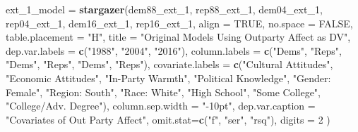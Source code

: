 \documentclass[
]{article}
\newenvironment{Shaded}{\begin{snugshade}}{\end{snugshade}}
\newcommand{\DataTypeTok}[1]{\textcolor[rgb]{0.13,0.29,0.53}{#1}}
\newcommand{\DecValTok}[1]{\textcolor[rgb]{0.00,0.00,0.81}{#1}}
\newcommand{\KeywordTok}[1]{\textcolor[rgb]{0.13,0.29,0.53}{\textbf{#1}}}
\newcommand{\NormalTok}[1]{#1}
\newcommand{\OtherTok}[1]{\textcolor[rgb]{0.56,0.35,0.01}{#1}}
\newcommand{\StringTok}[1]{\textcolor[rgb]{0.31,0.60,0.02}{#1}}
\begin{document}
\begin{Shaded}
\begin{Highlighting}[]
\NormalTok{ext_}\DecValTok{1}\NormalTok{_model =}\StringTok{ }\KeywordTok{stargazer}\NormalTok{(dem88_ext_}\DecValTok{1}\NormalTok{, rep88_ext_}\DecValTok{1}\NormalTok{, dem04_ext_}\DecValTok{1}\NormalTok{, rep04_ext_}\DecValTok{1}\NormalTok{, dem16_ext_}\DecValTok{1}\NormalTok{, rep16_ext_}\DecValTok{1}\NormalTok{, }\DataTypeTok{align =} \OtherTok{TRUE}\NormalTok{, }\DataTypeTok{no.space =} \OtherTok{FALSE}\NormalTok{,}
                                            \DataTypeTok{table.placement =} \StringTok{"H"}\NormalTok{,}
                                            \DataTypeTok{title =} \StringTok{"Original Models Using Outparty Affect as DV"}\NormalTok{,}
                                            \DataTypeTok{dep.var.labels =} \KeywordTok{c}\NormalTok{(}\StringTok{"1988"}\NormalTok{, }\StringTok{"2004"}\NormalTok{, }\StringTok{"2016"}\NormalTok{),}
                                            \DataTypeTok{column.labels =} \KeywordTok{c}\NormalTok{(}\StringTok{"Dems"}\NormalTok{, }\StringTok{"Reps"}\NormalTok{, }\StringTok{"Dems"}\NormalTok{, }\StringTok{"Reps"}\NormalTok{, }\StringTok{"Dems"}\NormalTok{, }\StringTok{"Reps"}\NormalTok{),}
                                            \DataTypeTok{covariate.labels =} \KeywordTok{c}\NormalTok{(}\StringTok{"Cultural Attitudes"}\NormalTok{, }\StringTok{"Economic Attitudes"}\NormalTok{,}
                                                                                     \StringTok{"In-Party Warmth"}\NormalTok{, }\StringTok{"Political Knowledge"}\NormalTok{,}
                                                                                     \StringTok{"Gender: Female"}\NormalTok{, }\StringTok{"Region: South"}\NormalTok{, }\StringTok{"Race: White"}\NormalTok{,}
                                                                                     \StringTok{"High School"}\NormalTok{, }\StringTok{"Some College"}\NormalTok{, }\StringTok{"College/Adv. Degree"}\NormalTok{),}
                                            \DataTypeTok{column.sep.width =} \StringTok{"-10pt"}\NormalTok{,}
                                            \DataTypeTok{dep.var.caption =} \StringTok{"Covariates of Out Party Affect"}\NormalTok{,}
                                            \DataTypeTok{omit.stat=}\KeywordTok{c}\NormalTok{(}\StringTok{"f"}\NormalTok{, }\StringTok{"ser"}\NormalTok{, }\StringTok{"rsq"}\NormalTok{),}
                                            \DataTypeTok{digits =} \DecValTok{2}
\NormalTok{)}
\end{Highlighting}
\end{Shaded}
\end{document}

